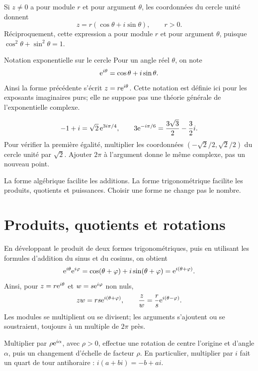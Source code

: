 Si $z\ne0$ a pour module $r$ et pour argument $\theta$, les coordonnées du cercle unité donnent
\[
z=r(\cos\theta+i\sin\theta),\qquad r>0.
\]
Réciproquement, cette expression a pour module $r$ et pour argument $\theta$, puisque $\cos^2\theta+\sin^2\theta=1$.

\begin{definition}{Notation exponentielle sur le cercle}{}
Pour un angle réel $\theta$, on note
\[
\mathrm{e}^{i\theta}=\cos\theta+i\sin\theta.
\]
Ainsi la forme précédente s'écrit $z=r\mathrm{e}^{i\theta}$. Cette notation est définie ici pour les exposants imaginaires purs; elle ne suppose pas une théorie générale de l'exponentielle complexe.
\end{definition}

\begin{examplebox}
\[
-1+i=\sqrt2\,\mathrm{e}^{3i\pi/4},\qquad
3\mathrm{e}^{-i\pi/6}=\frac{3\sqrt3}{2}-\frac32i.
\]
Pour vérifier la première égalité, multiplier les coordonnées $(-\sqrt2/2,\sqrt2/2)$ du cercle unité par $\sqrt2$. Ajouter $2\pi$ à l'argument donne le même complexe, pas un nouveau point.
\end{examplebox}

La forme algébrique facilite les additions. La forme trigonométrique facilite les produits, quotients et puissances. Choisir une forme ne change pas le nombre.

\section{Produits, quotients et rotations}
\label{manual:section:complexes.06}

En développant le produit de deux formes trigonométriques, puis en utilisant les formules d'addition du sinus et du cosinus, on obtient
\[
\mathrm{e}^{i\theta}\mathrm{e}^{i\varphi}
=\cos(\theta+\varphi)+i\sin(\theta+\varphi)
=\mathrm{e}^{i(\theta+\varphi)}.
\]
Ainsi, pour $z=r\mathrm{e}^{i\theta}$ et $w=s\mathrm{e}^{i\varphi}$ non nuls,
\[
zw=rs\mathrm{e}^{i(\theta+\varphi)},\qquad
\frac zw=\frac rs\mathrm{e}^{i(\theta-\varphi)}.
\]
Les modules se multiplient ou se divisent; les arguments s'ajoutent ou se soustraient, toujours à un multiple de $2\pi$ près.

\begin{visualbox}
Multiplier par $\rho\mathrm{e}^{i\alpha}$, avec $\rho>0$, effectue une rotation de centre l'origine et d'angle $\alpha$, puis un changement d'échelle de facteur $\rho$. En particulier, multiplier par $i$ fait un quart de tour antihoraire : $i(a+bi)=-b+ai$.
\end{visualbox}

